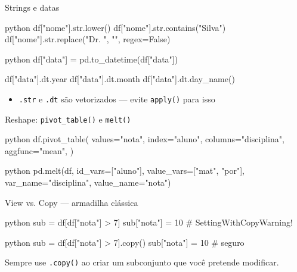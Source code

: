 \documentclass[xcolor=dvipsnames,t,aspectratio=169]{beamer}
\newcommand{\highlight}[1]{{\color{nes_dark_orange} #1}}
\begin{document}
\begin{frame}[c, fragile]{Strings e datas}

\begin{code}{python}
df["nome"].str.lower()
df["nome"].str.contains("Silva")
df["nome"].str.replace("Dr. ", "", regex=False)
\end{code}

\begin{code}[Accessor .dt]{python}
df["data"] = pd.to_datetime(df["data"])

df["data"].dt.year
df["data"].dt.month
df["data"].dt.day_name()
\end{code}

\begin{itemize}
    \item \texttt{.str} e \texttt{.dt} são \highlight{vetorizados} — evite \texttt{apply()} para isso
\end{itemize}

\end{frame}


\begin{frame}[c, fragile]{Reshape: \texttt{pivot\_table()} e \texttt{melt()}}

\begin{code}{python}
df.pivot_table(
    values="nota",
    index="aluno",
    columns="disciplina",
    aggfunc="mean",
)
\end{code}

\begin{code}{python}
pd.melt(df, id_vars=["aluno"],
        value_vars=["mat", "por"],
        var_name="disciplina",
        value_name="nota")
\end{code}


\end{frame}


\begin{frame}[c, fragile]{View vs. Copy — armadilha clássica}

\begin{code}[Problema]{python}
sub = df[df["nota"] > 7]
sub["nota"] = 10        # SettingWithCopyWarning!
\end{code}

\begin{code}[Solução]{python}
sub = df[df["nota"] > 7].copy()
sub["nota"] = 10        # seguro
\end{code}

\begin{display}[Regra]
Sempre use \texttt{.copy()} ao criar um subconjunto que você pretende modificar.
\end{display}

\end{frame}
\end{document}

